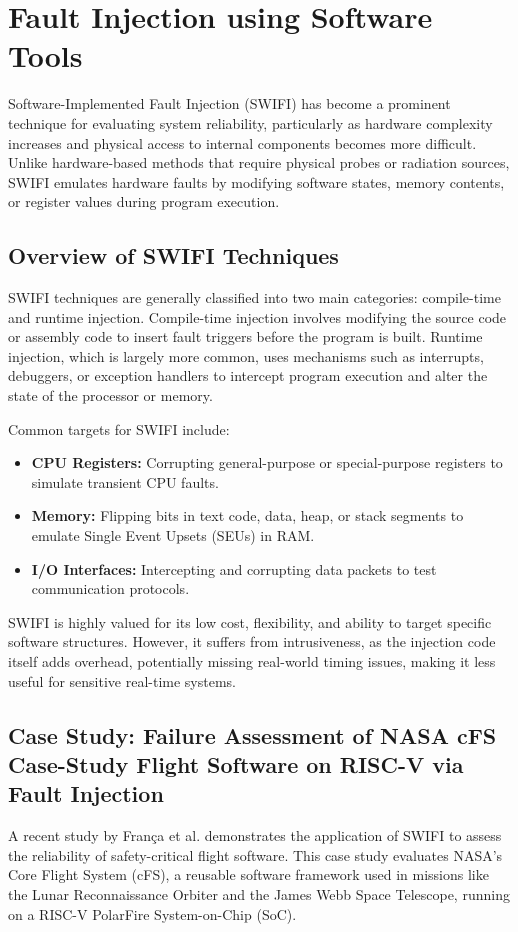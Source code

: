 \section{Fault Injection using Software Tools}

Software-Implemented Fault Injection (SWIFI) has become a prominent technique for evaluating system reliability, particularly as hardware complexity increases and physical access to internal components becomes more difficult. Unlike hardware-based methods that require physical probes or radiation sources, SWIFI emulates hardware faults by modifying software states, memory contents, or register values during program execution.

\subsection{Overview of SWIFI Techniques}
SWIFI techniques are generally classified into two main categories: compile-time and runtime injection. Compile-time injection involves modifying the source code or assembly code to insert fault triggers before the program is built. Runtime injection, which is largely more common, uses mechanisms such as interrupts, debuggers, or exception handlers to intercept program execution and alter the state of the processor or memory.

Common targets for SWIFI include:
\begin{itemize}
    \item \textbf{CPU Registers:} Corrupting general-purpose or special-purpose registers to simulate transient CPU faults.
    \item \textbf{Memory:} Flipping bits in  text code, data, heap, or stack segments to emulate Single Event Upsets (SEUs) in RAM.
    \item \textbf{I/O Interfaces:} Intercepting and corrupting data packets to test communication protocols.
\end{itemize}

SWIFI is highly valued for its low cost, flexibility, and ability to target specific software structures. However, it suffers from intrusiveness, as the injection code itself adds overhead, potentially missing real-world timing issues, making it less useful for sensitive real-time systems.

\subsection{Case Study: Failure Assessment of NASA cFS Case-Study Flight Software on RISC-V via Fault Injection}
A recent study by Fran\c{c}a et al. \cite{SoftwareSite} demonstrates the application of SWIFI to assess the reliability of safety-critical flight software. This case study evaluates NASA's Core Flight System (cFS), a reusable software framework used in missions like the Lunar Reconnaissance Orbiter and the James Webb Space Telescope, running on a RISC-V PolarFire System-on-Chip (SoC).

